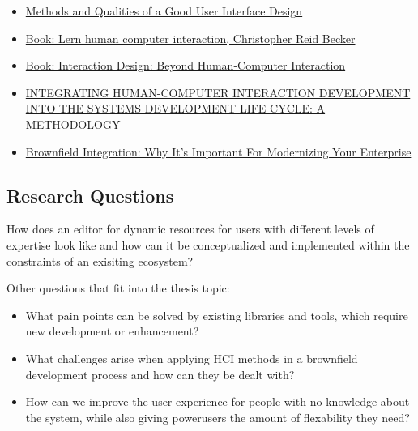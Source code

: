 \begin{itemize}
	\item \href{https://www.diva-portal.org/smash/get/diva2:215020/FULLTEXT01.pdf }{Methods and Qualities of a Good User Interface Design}
	\item \href{}{Book: Lern human computer interaction, Christopher Reid Becker}
	\item \href{}{Book: Interaction Design: Beyond Human-Computer Interaction }
	\item \href{https://citeseerx.ist.psu.edu/viewdoc/download?doi=10.1.1.75.2615&rep=rep1&type=pdf}{INTEGRATING HUMAN-COMPUTER INTERACTION DEVELOPMENT INTO THE SYSTEMS DEVELOPMENT LIFE CYCLE: A METHODOLOGY}
	\item \href{https://wso2.com/library/articles/2019/04/brownfield-integration-why-its-important-for-modernizing-your-enterprise/}{Brownfield Integration: Why It's Important For Modernizing Your Enterprise}
\end{itemize}

\subsection{Research Questions}
\label{subsec:question}
How does an editor for dynamic resources for users with different levels of expertise look like and how can it be conceptualized and implemented within the constraints of an exisiting ecosystem?


Other questions that fit into the thesis topic: \\
\begin{itemize}
  \item What pain points can be solved by existing libraries and tools, which require new development or enhancement?
  \item What challenges arise when applying HCI methods in a brownfield development process and how can they be dealt with?
  \item How can we improve the user experience for people with no knowledge about the system, while also giving powerusers the amount of flexability they need?
\end{itemize}
